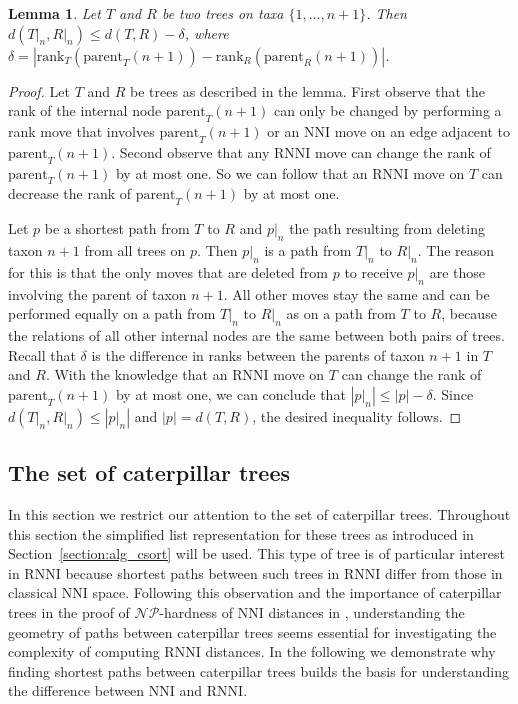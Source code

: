\documentclass{amsart}
\newcommand{\np}{\mathcal{NP}}
\newcommand{\parent}{\mathrm{parent}}
\newcommand{\rank}{\mathrm{rank}}
\newcommand{\nni}{\mathrm{NNI}}
\newcommand{\rnni}{\mathrm{RNNI}}
\newtheorem{lemma}[definition]{Lemma}
\begin{document}
\begin{lemma}
Let $T$ and $R$ be two trees on taxa $\{1, \ldots, n+1\}$.
Then $d(T{\big|}_n, R{\big|}_n) \leq d(T,R) - \delta$, where $\delta = |\rank_T(\parent_T(n+1)) - \rank_R(\parent_R(n+1))|$.
\label{lemma:distance_delete_taxon}
\end{lemma}

\begin{proof}
Let $T$ and $R$ be trees as described in the lemma.
First observe that the rank of the internal node $\parent_T(n+1)$ can only be changed by performing a rank move that involves $\parent_T(n+1)$ or an $\nni$ move on an edge adjacent to $\parent_T(n+1)$.
Second observe that any $\rnni$ move can change the rank of $\parent_T(n+1)$ by at most one.
So we can follow that an $\rnni$ move on $T$ can decrease the rank of $\parent_T(n+1)$ by at most one.

Let $p$ be a shortest path from $T$ to $R$ and $p{\big|}_n$ the path resulting from deleting taxon $n+1$ from all trees on $p$.
Then $p{\big|}_n$ is a path from $T{\big|}_n$ to $R{\big|}_n$.
The reason for this is that the only moves that are deleted from $p$ to receive $p{\big|}_n$ are those involving the parent of taxon $n+1$.
All other moves stay the same and can be performed equally on a path from $T{\big|}_n$ to $R{\big|}_n$ as on a path from $T$ to $R$, because the relations of all other internal nodes are the same between both pairs of trees.
Recall that $\delta$ is the difference in ranks between the parents of taxon $n+1$ in $T$ and $R$.
With the knowledge that an $\rnni$ move on $T$ can change the rank of $\parent_T(n+1)$ by at most one, we can conclude that $|p{\big|}_n| \leq |p| - \delta$.
Since $d(T{\big|}_n,R{\big|}_n) \leq |p{\big|}_n|$ and $|p| = d(T,R)$, the desired inequality follows.
\end{proof}


\subsection{The set of caterpillar trees}
\label{section:caterpillar_convex}

In this section we restrict our attention to the set of caterpillar trees.
Throughout this section the simplified list representation for these trees as introduced in Section~\ref{section:alg_csort} will be used.
This type of tree is of particular interest in $\rnni$ because shortest paths between such trees in $\rnni$ differ from those in classical $\nni$ space.
Following this observation and the importance of caterpillar trees in the proof of $\np$-hardness of $\nni$ distances in \autocite{Dasgupta2000-xa}, understanding the geometry of paths between caterpillar trees seems essential for investigating the complexity of computing $\rnni$ distances.
In the following we demonstrate why finding shortest paths between caterpillar trees builds the basis for understanding the difference between $\nni$ and $\rnni$.
\end{document}
